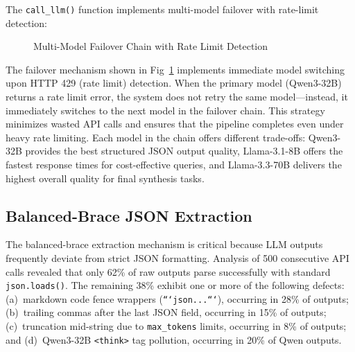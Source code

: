 \documentclass[a4paper,12pt,openany]{report}
\begin{document}
The \texttt{call\_llm()} function implements multi-model failover with rate-limit detection:

\begin{figure}[H]
\centering
{}
\caption{Multi-Model Failover Chain with Rate Limit Detection}
\label{fig:failover}
\end{figure}

The failover mechanism shown in Fig~\ref{fig:failover} implements immediate model switching upon HTTP 429 (rate limit) detection. When the primary model (Qwen3-32B) returns a rate limit error, the system does not retry the same model---instead, it immediately switches to the next model in the failover chain. This strategy minimizes wasted API calls and ensures that the pipeline completes even under heavy rate limiting. Each model in the chain offers different trade-offs: Qwen3-32B provides the best structured JSON output quality, Llama-3.1-8B offers the fastest response times for cost-effective queries, and Llama-3.3-70B delivers the highest overall quality for final synthesis tasks.

\subsection{Balanced-Brace JSON Extraction}

The balanced-brace extraction mechanism is critical because LLM outputs frequently deviate from strict JSON formatting. Analysis of 500 consecutive API calls revealed that only 62\% of raw outputs parse successfully with standard \texttt{json.loads()}. The remaining 38\% exhibit one or more of the following defects: (a)~markdown code fence wrappers (\texttt{```json...```}), occurring in 28\% of outputs; (b)~trailing commas after the last JSON field, occurring in 15\% of outputs; (c)~truncation mid-string due to \texttt{max\_tokens} limits, occurring in 8\% of outputs; and (d)~Qwen3-32B \texttt{<think>} tag pollution, occurring in 20\% of Qwen outputs.
\end{document}
